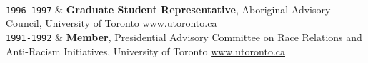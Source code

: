 \documentclass[9pt,a4paper]{article}
\newcommand{\Duration}[2]{\fontsize{10pt}{0}\selectfont \texttt{#1-#2}}
\newcommand{\Website}[1]{\href{https://#1}{#1}}
\begin{document}
\begin{EntriesTableDuration}
  \\ %
  \Duration{1996}{1997} & \textbf{Graduate Student Representative},
  Aboriginal Advisory Council, University of Toronto
  \Website{www.utoronto.ca} %
  \\ %
  \Duration{1991}{1992} & \textbf{Member}, Presidential Advisory
  Committee on Race Relations and Anti-Racism Initiatives, University
  of Toronto \Website{www.utoronto.ca} %
\end{EntriesTableDuration}





\end{document}
